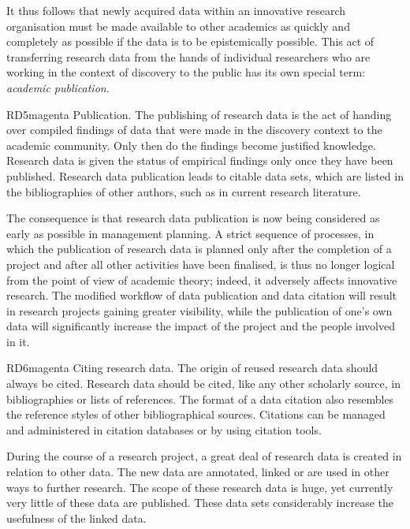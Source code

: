 \documentclass[
  english,
  paper=a4,
  oneside,captions=tableheading
]{scrbook}
\begin{document}
It thus follows that newly acquired data within an innovative research
organisation must be made available to other academics as quickly and
completely as possible if the data is to be epistemically possible. This
act of transferring research data from the hands of individual
researchers who are working in the context of discovery to the public
has its own special term: \emph{academic publication}.

\begin{awesomeblock}[magenta]{1pt}{RD5}{magenta} Publication. The publishing of research data is the act of handing over compiled findings of data that were made in the discovery context to the academic community. Only then do the findings become justified knowledge. Research data is given the status of empirical findings only once they have been published. Research data publication leads to citable data sets, which are listed in the bibliographies of other authors, such as in current research literature.\end{awesomeblock}

The consequence is that research data publication is now being
considered as early as possible in management planning. A strict
sequence of processes, in which the publication of research data is
planned only after the completion of a project and after all other
activities have been finalised, is thus no longer logical from the point
of view of academic theory; indeed, it adversely affects innovative
research. The modified workflow of data publication and data citation
will result in research projects gaining greater visibility, while the
publication of one's own data will significantly increase the impact of
the project and the people involved in it.

\begin{awesomeblock}[magenta]{1pt}{RD6}{magenta} Citing research data. The origin of reused research data should always be cited. Research data should be cited, like any other scholarly source, in bibliographies or lists of references. The format of a data citation also resembles the reference styles of other bibliographical sources. Citations can be managed and administered in citation databases or by using citation tools.\end{awesomeblock}

During the course of a research project, a great deal of research data
is created in relation to other data. The new data are annotated, linked
or are used in other ways to further research. The scope of these
research data is huge, yet currently very little of these data are
published. These data sets considerably increase the usefulness of the
linked data.
\end{document}
